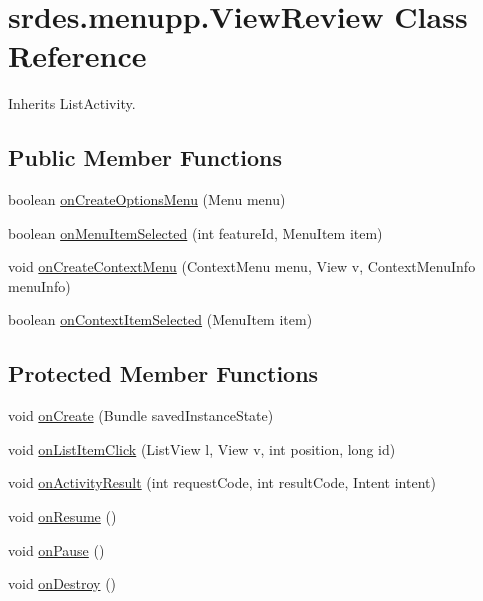 \hypertarget{classsrdes_1_1menupp_1_1_view_review}{\section{srdes.\-menupp.\-View\-Review \-Class \-Reference}
\label{classsrdes_1_1menupp_1_1_view_review}
}


\-Inherits \-List\-Activity.

\subsection*{\-Public \-Member \-Functions}
\begin{DoxyCompactItemize}
\item 
boolean \hyperlink{classsrdes_1_1menupp_1_1_view_review_a77fb3cf9ecc6c4aad9825aff46dd0ecc}{on\-Create\-Options\-Menu} (\-Menu menu)
\item 
boolean \hyperlink{classsrdes_1_1menupp_1_1_view_review_ab519eb92857386454bb7bdb33cfa55e9}{on\-Menu\-Item\-Selected} (int feature\-Id, \-Menu\-Item item)
\item 
void \hyperlink{classsrdes_1_1menupp_1_1_view_review_aa70ada784267e25a3b6c7a6a6c55ec90}{on\-Create\-Context\-Menu} (\-Context\-Menu menu, \-View v, \-Context\-Menu\-Info menu\-Info)
\item 
boolean \hyperlink{classsrdes_1_1menupp_1_1_view_review_af5a916c5fc07339a78987761b4c445e6}{on\-Context\-Item\-Selected} (\-Menu\-Item item)
\end{DoxyCompactItemize}
\subsection*{\-Protected \-Member \-Functions}
\begin{DoxyCompactItemize}
\item 
void \hyperlink{classsrdes_1_1menupp_1_1_view_review_a2952e8efcde768a985920ec8b51d157f}{on\-Create} (\-Bundle saved\-Instance\-State)
\item 
void \hyperlink{classsrdes_1_1menupp_1_1_view_review_a61b57e3ddaf19bec45d46126efbbf459}{on\-List\-Item\-Click} (\-List\-View l, \-View v, int position, long id)
\item 
void \hyperlink{classsrdes_1_1menupp_1_1_view_review_a0e24c2e1859e27c30bb3f33b988c8712}{on\-Activity\-Result} (int request\-Code, int result\-Code, \-Intent intent)
\item 
void \hyperlink{classsrdes_1_1menupp_1_1_view_review_a72107160a16f20147fee169b438a185a}{on\-Resume} ()
\item 
void \hyperlink{classsrdes_1_1menupp_1_1_view_review_a6c4b1972b9978937f6574d1d32a8b20f}{on\-Pause} ()
\item 
void \hyperlink{classsrdes_1_1menupp_1_1_view_review_ad9817ae3cc0cd60a16660c5eab16020b}{on\-Destroy} ()
\end{DoxyCompactItemize}
